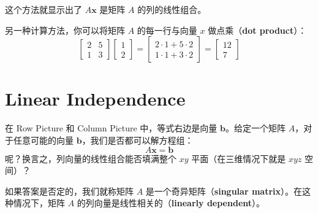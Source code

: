 \documentclass[green, cn, normal]{elegantnote}
\begin{document}
	这个方法就显示出了 $A \textbf{x}$ 是矩阵 $A$ 的列的线性组合。
	
	另一种计算方法，你可以将矩阵 $A$ 的每一行与向量 $x$ 做点乘（\textbf{dot product}）：
	\[
	\begin{bmatrix}
	2 & 5 \\
	1 & 3
	\end{bmatrix} \begin{bmatrix}
	1 \\
	2
	\end{bmatrix} = \begin{bmatrix}
	2 \cdot 1 + 5 \cdot 2 \\
	1 \cdot 1 + 3 \cdot 2
	\end{bmatrix} = \begin{bmatrix}
	12 \\
	7
	\end{bmatrix}
	\]
	
	\section{Linear Independence}
	
	在 Row Picture 和 Column Picture 中，等式右边是向量 $\textbf{b}$。给定一个矩阵 $A$，对于任意可能的向量 $\textbf{b}$，我们是否都可以解方程组：
	\[
	A\textbf{x} = \textbf{b}
	\]
	呢？换言之，列向量的线性组合能否填满整个 $xy$ 平面（在三维情况下就是 $xyz$ 空间）？
	
	如果答案是否定的，我们就称矩阵 $A$ 是一个奇异矩阵（\textbf{singular matrix}）。在这种情况下，矩阵 $A$ 的列向量是线性相关的（\textbf{linearly dependent}）。
\end{document}
